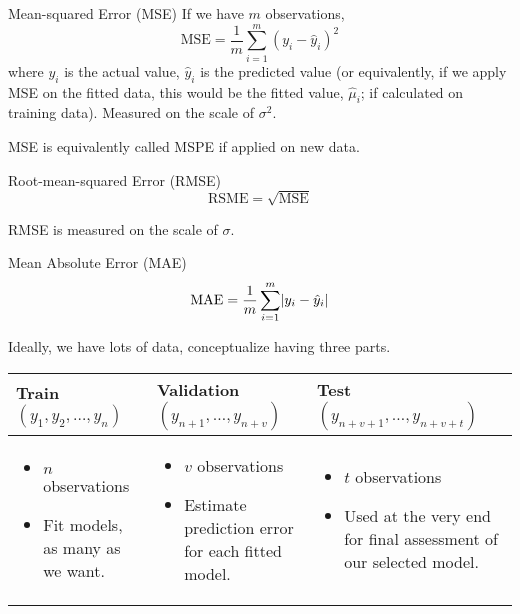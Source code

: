 \begin{Definition}{Mean-squared Error (MSE)}{}
      If we have $ m $
      observations,
      \[ \text{MSE}=\frac{1}{m} \sum_{i=1}^{m} (y_i-\hat{y}_i)^2 \]
      where $ y_i $ is the actual value, $ \hat{y}_i $ is the
      predicted value (or equivalently, if we apply MSE on the fitted
      data, this would be the fitted value, $ \hat{\mu}_i $;
      if calculated on training data).
      Measured on the scale of $ \sigma^2 $.
\end{Definition}
\begin{Remark}{}{}
      MSE is equivalently called MSPE if applied on new data.
\end{Remark}
\begin{Definition}{Root-mean-squared Error (RMSE)}{}
      \[ \text{RSME}=\sqrt{\text{MSE}} \]
\end{Definition}
\begin{Remark}{}{}
      RMSE is measured on the scale of $ \sigma $.
\end{Remark}
\begin{Definition}{Mean Absolute Error (MAE)}{}
      \[ \text{MAE}=\frac{1}{m} \sum_{i=1}^{m} \lvert y_i-\hat{y}_i\rvert \]
\end{Definition}
Ideally, we have lots of data, conceptualize having three parts.
\begin{table}[ht]
      \centering
      \begin{tabularx}{\linewidth}{@{}YYY@{}}
            \toprule
            Train $ (y_1,y_2,\ldots,y_n) $ & Validation $ (y_{n+1},\ldots,y_{n+v}) $ & Test $ (y_{n+v+1},\ldots,y_{n+v+t}) $ \\
            \midrule
            \begin{itemize}
                  \item $ n $ observations
                  \item Fit models, as many as we want.
            \end{itemize}
                                           &
            \begin{itemize}
                  \item $ v $ observations
                  \item Estimate prediction error
                        for each fitted model.
            \end{itemize}
                                           &
            \begin{itemize}
                  \item $ t $ observations
                  \item Used at the very end for final assessment
                        of our selected model.
            \end{itemize}                                                                                        \\
            \bottomrule
      \end{tabularx}
\end{table}

